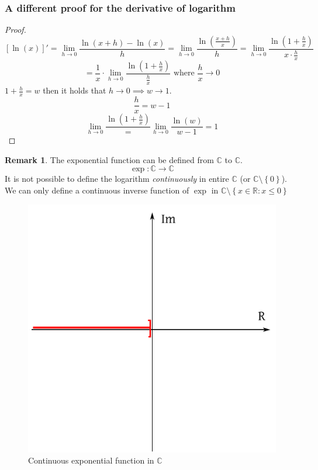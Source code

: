 \documentclass[a4paper,landscape,twocolumn]{article}
\theoremstyle{definition}
\newtheorem{rem}{Remark}
\newcommand\set[1]{\left\{#1\right\}}
\begin{document}
\subsubsection{A different proof for the derivative of logarithm}
%
\begin{proof}
  \[
    [\ln(x)]'
    = \lim_{h\to0} \frac{\ln(x + h) - \ln(x)}{h}
    = \lim_{h\to0} \frac{\ln\left(\frac{x+h}{x}\right)}{h}
    = \lim_{h\to0} \frac{\ln\left(1 + \frac{h}{x}\right)}{x \cdot \frac hx}
  \] \[
    = \frac1x \cdot \lim_{h\to0} \frac{\ln\left(1 + \frac{h}{x}\right)}{\frac{h}{x}}
    \text{ where } \frac hx \to 0
  \]
  $1 + \frac{h}{x} = w$ then it holds that $h \to 0 \implies w \to 1$.
  \[ \frac{h}{x} = w - 1 \]
  \[ \lim_{h\to0} \frac{\ln\left(1 + \frac{h}{x}\right)} = \lim_{h\to0} \frac{\ln(w)}{w - 1} = 1 \]
\end{proof}

\begin{rem}
  The exponential function can be defined from $\mathbb C$ to $\mathbb C$.
  \[ \exp: \mathbb C \to \mathbb C \]
  It is not possible to define the logarithm \emph{continuously} in entire $\mathbb C$
  (or $\mathbb C \setminus \set{0}$). We can only define a continuous inverse function
  of $\exp$ in $\mathbb C \setminus \set{x \in \mathbb R: x \leq 0}$
\end{rem}

\begin{figure}[!h]
  \begin{center}
    \includegraphics{img/continuous-exp-in-C.pdf}
    \caption{Continuous exponential function in $\mathbb C$}
  \end{center}
\end{figure}
\end{document}
